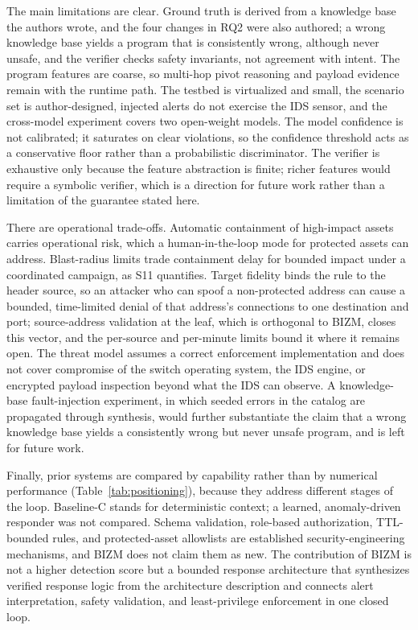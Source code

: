\documentclass[final,5p]{elsarticle}
\begin{document}
The main limitations are clear. Ground truth is derived from a knowledge base the authors wrote, and the four changes in RQ2 were also authored; a wrong knowledge base yields a program that is consistently wrong, although never unsafe, and the verifier checks safety invariants, not agreement with intent. The program features are coarse, so multi-hop pivot reasoning and payload evidence remain with the runtime path. The testbed is virtualized and small, the scenario set is author-designed, injected alerts do not exercise the IDS sensor, and the cross-model experiment covers two open-weight models. The model confidence is not calibrated; it saturates on clear violations, so the confidence threshold acts as a conservative floor rather than a probabilistic discriminator. The verifier is exhaustive only because the feature abstraction is finite; richer features would require a symbolic verifier, which is a direction for future work rather than a limitation of the guarantee stated here.

There are operational trade-offs. Automatic containment of high-impact assets carries operational risk, which a human-in-the-loop mode for protected assets can address. Blast-radius limits trade containment delay for bounded impact under a coordinated campaign, as S11 quantifies. Target fidelity binds the rule to the header source, so an attacker who can spoof a non-protected address can cause a bounded, time-limited denial of that address's connections to one destination and port; source-address validation at the leaf, which is orthogonal to BIZM, closes this vector, and the per-source and per-minute limits bound it where it remains open. The threat model assumes a correct enforcement implementation and does not cover compromise of the switch operating system, the IDS engine, or encrypted payload inspection beyond what the IDS can observe. A knowledge-base fault-injection experiment, in which seeded errors in the catalog are propagated through synthesis, would further substantiate the claim that a wrong knowledge base yields a consistently wrong but never unsafe program, and is left for future work.

Finally, prior systems are compared by capability rather than by numerical performance (Table~\ref{tab:positioning}), because they address different stages of the loop. Baseline-C stands for deterministic context; a learned, anomaly-driven responder was not compared. Schema validation, role-based authorization, TTL-bounded rules, and protected-asset allowlists are established security-engineering mechanisms, and BIZM does not claim them as new. The contribution of BIZM is not a higher detection score but a bounded response architecture that synthesizes verified response logic from the architecture description and connects alert interpretation, safety validation, and least-privilege enforcement in one closed loop.
\end{document}
